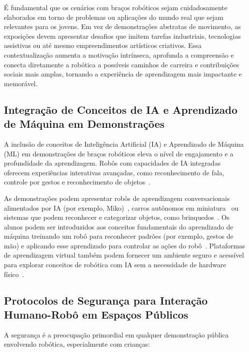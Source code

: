 \documentclass[%
  a4paper,%
  12pt,%
  fleqn,%
  english,%
  brazilian,%
]{article}
\begin{document}
É fundamental que os cenários com braços robóticos sejam cuidadosamente elaborados em torno de problemas ou aplicações do mundo real que sejam relevantes para os jovens. Em vez de demonstrações abstratas de movimento, as exposições devem apresentar desafios que imitem tarefas industriais, tecnologias assistivas ou até mesmo empreendimentos artísticos criativos. Essa contextualização aumenta a motivação intrínseca, aprofunda a compreensão e conecta diretamente a robótica a possíveis caminhos de carreira e contribuições sociais mais amplas, tornando a experiência de aprendizagem mais impactante e memorável.


\subsection{Integração de Conceitos de IA e Aprendizado de Máquina em Demonstrações}
\label{sec:integracao_conceitos_ia_aprendizado}
A inclusão de conceitos de Inteligência Artificial (IA) e Aprendizado de Máquina (ML) em demonstrações de braços robóticos eleva o nível de engajamento e a profundidade da aprendizagem. Robôs com capacidades de IA integradas oferecem experiências interativas avançadas, como reconhecimento de fala, controle por gestos e reconhecimento de objetos~\cite{vexRoboticsHome2025}.

As demonstrações podem apresentar robôs de aprendizagem conversacionais alimentados por IA (por exemplo, Miko)~\cite{mikoAIPoweredRobot2025}, carros autônomos em miniatura~\cite{stempediaProjects2025} ou sistemas que podem reconhecer e categorizar objetos, como brinquedos~\cite{stempediaProjects2025}. Os alunos podem ser introduzidos aos conceitos fundamentais do aprendizado de máquina treinando um robô para reconhecer padrões (por exemplo, gestos de mão) e aplicando esse aprendizado para controlar as ações do robô~\cite{stempediaProjects2025}. Plataformas de aprendizagem virtual também podem fornecer um ambiente seguro e acessível para explorar conceitos de robótica com IA sem a necessidade de hardware físico~\cite{coderoboPickPlace2025}.

\subsection{Protocolos de Segurança para Interação Humano-Robô em Espaços Públicos}
\label{sec:seguranca_bracos}
A segurança é a preocupação primordial em qualquer demonstração pública envolvendo robótica, especialmente com crianças:
\end{document}
